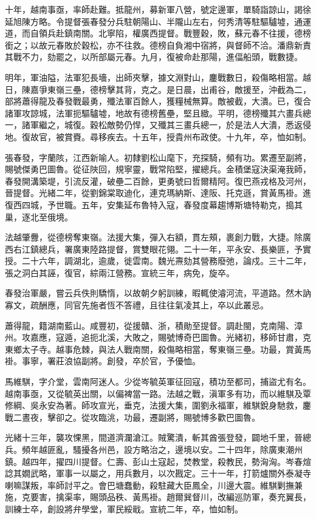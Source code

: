 \begin{pinyinscope}
十年，越南事亟，率師赴難。抵龍州，募新軍八營，號定邊軍，單騎詣諒山，謁徐延旭陳方略。令提督張春發分兵駐朝陽山、半隴山左右，何秀清等駐驅驢墟，通運道，而自領兵赴鎮南關。北寧陷，權廣西提督。戰豐穀，敗，蘇元春不往援，德榜銜之；以故元春敗於穀松，亦不往救。德榜自負湘中宿將，與督師不洽。潘鼎新責其戰不力，劾罷之，以所部屬元春。九月，復被命赴那陽，進偪船頭，戰數捷。

明年，軍油隘，法軍犯長墻，出師夾擊，據文淵對山，鏖戰數日，殺傷略相當。越日，陳嘉爭東嶺三壘，德榜擊其背，克之。是日晨，出甫谷，敵援至，沖截為二，部將蕭得龍及春發戰最勇，殲法軍百餘人，獲糧械無算。敵被截，大潰。已，復合諸軍攻諒城，法軍扼驅驢墟，地故有德榜舊壘，堅且緻。平明，德榜殲其六畫兵總一，諸軍繼之，城復。穀松敵勢仍悍，又殲其三畫兵總一，於是法人大潰，悉返侵地。復故官，被賞賚。尋移疾去。十五年，授貴州布政使。十九年，卒，恤如制。

張春發，字蘭陔，江西新喻人。初隸劉松山麾下，充探騎，頻有功。累遷至副將，賜號傑勇巴圖魯。從征陜回，規寧靈，戰常陷堅，擢總兵。金積堡寇決渠淹我師，春發開溝築堤，引流反灌，破壘二百餘，更勇號曰哲爾精阿。復巴燕戎格及河州，晉提督。光緒二年，從劉錦棠取迪化，連克瑪納斯、達阪、托克遜，賞黃馬褂。進復西四城，予世職。五年，安集延布魯特入寇，春發度幕趨博斯塘特勒克，搗其巢，逐北至俄境。

法越肇釁，從德榜奪東嶺。法援大集，彈入右額，貫左頰，裹創力戰，大捷。除廣西右江鎮總兵，署廣東陸路提督，賞雙眼花翎。二十一年，平永安、長樂匪，予實授。二十六年，調湖北，逾歲，徙雲南。魏光燾劾其營務廢弛，論戍。三十二年，張之洞白其誣，復官，綜兩江營務。宣統三年，病免，旋卒。

春發治軍嚴，嘗云兵佚則驕惰，以故朝夕躬訓練，暇輒使濬河流，平道路。然木訥寡文，疏酬應，同官先施者恆不答禮，且往往氣凌其上，卒以此叢忌。

蕭得龍，籍湖南藍山。咸豐初，從援贛、浙，積勛至提督。調赴閩，克南陽、漳州。攻嘉應，寇遁，追扼北溪，大敗之，賜號博奇巴圖魯。光緒初，移師甘肅，克東鄉太子寺。越事危棘，與法人戰南關，殺傷略相當，奪東嶺三壘。功最，賞黃馬褂。事寧，署莊浪協副將。創發，卒於官，予優恤。

馬維騏，字介堂，雲南阿迷人。少從岑毓英軍征回寇，積功至都司，捕盜尤有名。越南事亟，又從毓英出關，以偏裨當一路。法越之戰，滇軍多有功，而以維騏及覃修綱、吳永安為著。師攻宣光，垂克，法援大集，圍劉永福軍，維騏銳身馳救，鏖戰二晝夜，擊卻之。從攻臨洮，功最，遷副將，賜號博多歡巴圖魯。

光緒十三年，襲攻惈黑，間道濟瀾滄江。賊驚潰，斬其酋張登發，闢地千里，晉總兵。頻年越匪亂，騷擾各州邑，設方略治之，邊境以安。二十四年，除廣東潮州鎮。越四年，擢四川提督。仁壽、彭山土寇起，焚教堂，殺教民，勢洶洶。岑春煊諗其嫺武略，軍事一以屬之，用兵數月，以次戡定。三十一年，打箭爐關外泰凝寺喇嘛謀叛，率師討平之。會巴塘蠢動，殺駐藏大臣鳳全，川邊大震。維騏剿撫兼施，克要害，擒渠率，賜頭品秩、黃馬褂。趙爾巽督川，改編巡防軍，奏充翼長，訓練士卒，創設將弁學堂，軍民綏戢。宣統二年，卒，恤如制。


\end{pinyinscope}
